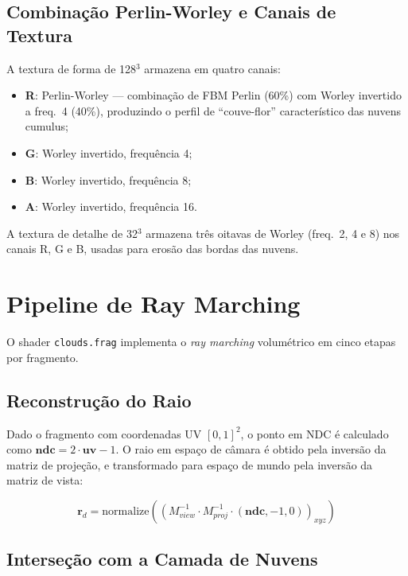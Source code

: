 \subsection{Combinação Perlin-Worley e Canais de Textura}
\label{chap4:subsec:shapetex}

A textura de forma de 128$^3$ armazena em quatro canais:
\begin{itemize}
    \item \textbf{R}: Perlin-Worley --- combinação de FBM Perlin (60\%) com Worley invertido a freq.~4 (40\%), produzindo o perfil de ``couve-flor'' característico das nuvens cumulus;
    \item \textbf{G}: Worley invertido, frequência 4;
    \item \textbf{B}: Worley invertido, frequência 8;
    \item \textbf{A}: Worley invertido, frequência 16.
\end{itemize}

A textura de detalhe de 32$^3$ armazena três oitavas de Worley (freq.~2, 4 e 8) nos canais R, G e B, usadas para erosão das bordas das nuvens.

\section{Pipeline de Ray Marching}
\label{chap4:sec:pipeline}

O shader \texttt{clouds.frag} implementa o \emph{ray marching} volumétrico em cinco etapas por fragmento.

\subsection{Reconstrução do Raio}
\label{chap4:subsec:ray}

Dado o fragmento com coordenadas UV $[0,1]^2$, o ponto em \ac{NDC} é calculado como $\mathbf{ndc} = 2\cdot\mathbf{uv} - 1$. O raio em espaço de câmara é obtido pela inversão da matriz de projeção, e transformado para espaço de mundo pela inversão da matriz de vista:

\begin{equation}
\mathbf{r}_d = \text{normalize}\left((M_{view}^{-1} \cdot M_{proj}^{-1} \cdot (\mathbf{ndc}, -1, 0))_{xyz}\right)
\label{eq:raydir}
\end{equation}

\subsection{Interseção com a Camada de Nuvens}
\label{chap4:subsec:intersec}

